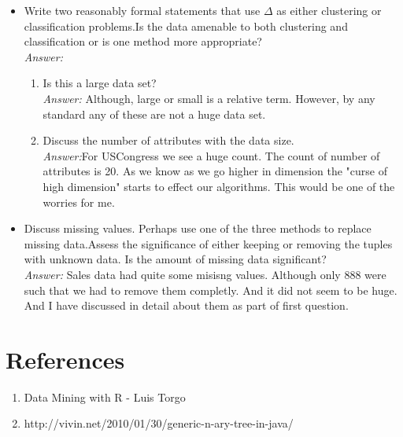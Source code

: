 \documentclass{article}
\begin{document}
\begin{itemize}
	\renewcommand{\labelitemi}{$\bullet$}
	\item Write two reasonably formal statements that use $\Delta$ as either clustering or classification problems.Is the data amenable to both clustering and classification or is one method more appropriate?\\
	\emph{Answer:}
	
	\begin{enumerate}[1.]
		\item Is this a large data set?\\
		\emph{Answer:} Although, large or small is a relative term. However, by any standard any of these are not a huge data set.

		\item Discuss the number of attributes with the data size.\\
		\emph{Answer:}For USCongress we see a huge count. The count of number of attributes is 20. As we know as we go higher in dimension the "curse of high dimension" starts to effect our algorithms. This would be one of the worries for me. 
	\end{enumerate}

	\item Discuss missing values. Perhaps use one of the three methods to replace missing data.Assess the significance of either keeping or removing the tuples with unknown data. Is the amount of missing data significant?\\
	\emph{Answer:} Sales data had quite some misisng values. Although only 888 were such that we had to remove them completly. And it did not seem to be huge. And I have discussed in detail about them as part of first question.
\end{itemize}	
\section*{References}
	\begin{enumerate}
		\item Data Mining with R - Luis Torgo
		\item http://vivin.net/2010/01/30/generic-n-ary-tree-in-java/
	\end{enumerate}
\end{document}
